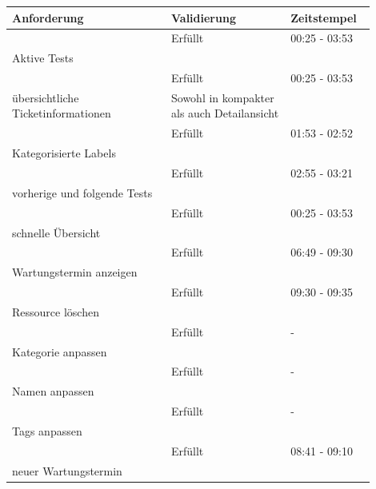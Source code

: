 \begin{longtable}{| P{0.4\linewidth} | P{0.3\linewidth} | P{0.2\linewidth} |} 
  \hline
  \textbf{Anforderung} & \textbf{Validierung} & \textbf{Zeitstempel}\\ [0.5ex]  \hline
  
   & Erfüllt & 00:25 - 03:53 \\
  Aktive Tests & & \\ [0.5ex] \hline

   & Erfüllt & 00:25 - 03:53 \\
  übersichtliche Ticketinformationen & Sowohl in kompakter als auch Detailansicht & \\ [0.5ex] \hline

   & Erfüllt & 01:53 - 02:52 \\
  Kategorisierte Labels &  & \\ [0.5ex] \hline

   & Erfüllt & 02:55 - 03:21 \\
  vorherige und folgende Tests &  & \\ [0.5ex] \hline

   & Erfüllt & 00:25 - 03:53 \\
  schnelle Übersicht &  & \\ [0.5ex] \hline

   & Erfüllt & 06:49 - 09:30 \\
  Wartungstermin anzeigen &  & \\ [0.5ex] \hline

   & Erfüllt & 09:30 - 09:35 \\
  Ressource löschen &  & \\ [0.5ex] \hline

   & Erfüllt & - \\
  Kategorie anpassen &  & \\ [0.5ex] \hline

   & Erfüllt & - \\
  Namen anpassen &  & \\ [0.5ex] \hline

   & Erfüllt & - \\
  Tags anpassen &  & \\ [0.5ex] \hline

   & Erfüllt & 08:41 - 09:10 \\
  neuer Wartungstermin &  & \\ [0.5ex] \hline


\end{longtable}
